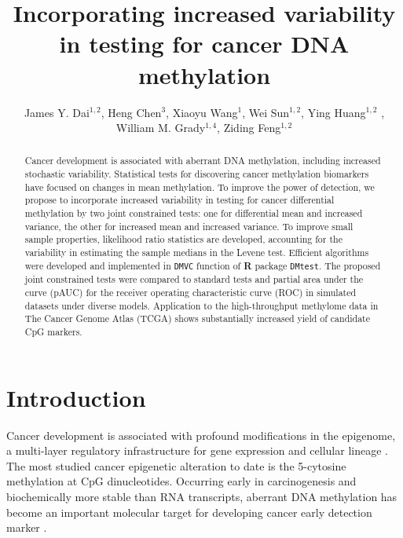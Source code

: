 \documentclass{statsoc}
\title[Incorporating increased variability in cancer biomarker discovery]{Incorporating increased variability in testing for cancer DNA methylation}
\author[James Y. Dai {\it et al.}]{\small James Y. Dai$^{1,2}$, Heng Chen$^{3}$, Xiaoyu Wang$^{1}$,  Wei Sun$^{1,2}$, Ying Huang$^{1,2}$ , William M. Grady$^{1,4}$, Ziding Feng$^{1,2}$}
\begin{document}
\begin{abstract}
Cancer development is associated with aberrant DNA methylation, including increased stochastic variability. Statistical tests for discovering cancer methylation biomarkers have focused on changes in mean methylation. To improve the power of  detection, we propose to incorporate increased variability in testing for cancer differential methylation by two joint constrained tests: one for differential mean and increased variance, the other for increased mean and increased variance. To improve small sample properties, likelihood ratio statistics are developed, accounting for the variability in estimating the sample medians in the Levene test. Efficient algorithms were developed and  implemented in \texttt{DMVC} function of {\bf R} package \texttt{DMtest}. The proposed joint constrained tests were compared to standard tests and partial area under the curve (pAUC) for the receiver operating characteristic curve (ROC) in simulated datasets under diverse models. Application to the high-throughput methylome data in The Cancer Genome Atlas (TCGA) shows substantially increased yield of candidate CpG markers.
\end{abstract}

\section{Introduction}
\label{sec1}

Cancer development is associated with profound modifications in the epigenome, a multi-layer regulatory infrastructure for gene expression and cellular lineage \citep{Esteller2007,Esteller2008,Baylin2011,Shen2013a}. The most studied cancer epigenetic alteration to date is the 5-cytosine methylation at CpG dinucleotides. Occurring early in carcinogenesis and biochemically more stable than RNA transcripts, aberrant DNA methylation has become an important molecular target for developing cancer early detection marker \citep{Laird2003,Issa2008}.

\end{document}
